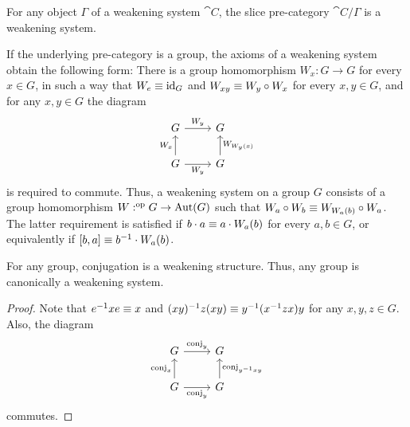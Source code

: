 \begin{cor}
For any object $\Gamma$ of a weakening system $\cat{C}$, the slice pre-category
$\cat{C}/\Gamma$ is a weakening system.
\end{cor}

\begin{eg}
If the underlying pre-category is a group, the axioms of a weakening system
obtain the following form: There is a group homomorphism $W_x:G\to G$ for
every $x\in G$, in such a way that $W_e\equiv {\mathrm{id}_{G}}$ and $W_{xy}\equiv W_y\circ W_x$
for every $x,y\in G$, and for any $x,y\in G$ the diagram
\begin{equation*}
\begin{tikzcd}
G \arrow[r,"W_y"]
  &
G 
  \\
G \arrow[u,"W_x"]
  \arrow[r,swap,"W_y"]
  &
G \arrow[u,swap,"W_{W_y(x)}"]
\end{tikzcd}
\end{equation*}
is required to commute. Thus, a weakening system on a group $G$ consists of
a group homomorphism $W:^{\mathrm{op}} G\to\mathrm{Aut}(G)$ such that $W_a\circ W_b\equiv 
W_{W_a(b)}\circ W_a$. The latter requirement is satisfied if $b\cdot a\equiv a\cdot W_a(b)$
for every $a,b\in G$, or equivalently if $[b,a]\equiv b^{-1}\cdot W_a(b)$.
\end{eg}

\begin{lem}
For any group, conjugation is a weakening structure. Thus, any group is
canonically a weakening system.
\end{lem}

\begin{proof}
Note that $e^{-1}xe\equiv x$ and $(xy)^{-1}z(xy)\equiv y^{-1}(x^{-1}zx)y$ for any $x,y,z\in G$.
Also, the diagram
\begin{equation*}
\begin{tikzcd}
G \arrow[r,"\mathrm{conj}_y"]
  &
G 
  \\
G \arrow[u,"\mathrm{conj}_x"]
  \arrow[r,swap,"\mathrm{conj}_y"]
  &
G \arrow[u,swap,"\mathrm{conj}_{y^{-1}xy}"]
\end{tikzcd}
\end{equation*}
commutes.
\end{proof}

\begin{comment}
\begin{rmk}
Similarly, every groupoid has a canonical weakening structure given by
conjugation.
\end{rmk}
\end{comment}

